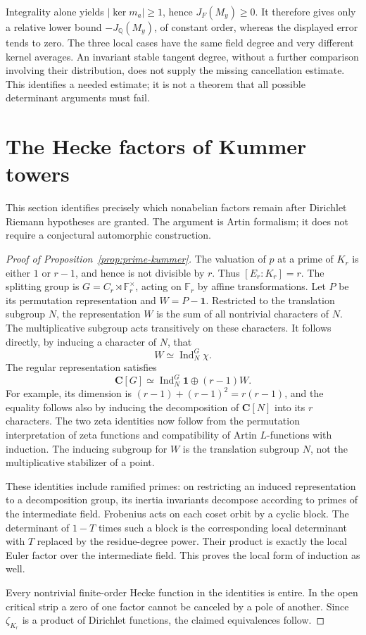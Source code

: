 \documentclass[11pt]{article}
\theoremstyle{remark}\newtheorem{remark}[theorem]{Remark}
\newcommand{\Q}{\mathbb Q}\newcommand{\Z}{\mathbb Z}\newcommand{\C}{\mathbb C}
\newcommand{\F}{\mathbb F}\newcommand{\Gal}{\operatorname{Gal}}
\begin{document}
Integrality alone yields $|\ker m_a|\ge1$, hence $J_F(M_y)\ge0$. It therefore gives only a relative lower bound $-J_\Q(M_y)$, of constant order, whereas the displayed error tends to zero. The three local cases have the same field degree and very different kernel averages. An invariant stable tangent degree, without a further comparison involving their distribution, does not supply the missing cancellation estimate. This identifies a needed estimate; it is not a theorem that all possible determinant arguments must fail.

\section{The Hecke factors of Kummer towers}
This section identifies precisely which nonabelian factors remain after Dirichlet Riemann hypotheses are granted. The argument is Artin formalism; it does not require a conjectural automorphic construction.

\begin{proof}[Proof of Proposition~\ref{prop:prime-kummer}]
The valuation of $p$ at a prime of $K_r$ is either $1$ or $r-1$, and hence is not divisible by $r$. Thus $[E_r:K_r]=r$. The splitting group is $G=C_r\rtimes\F_r^\times$, acting on $\F_r$ by affine transformations. Let $P$ be its permutation representation and $W=P-\mathbf1$. Restricted to the translation subgroup $N$, the representation $W$ is the sum of all nontrivial characters of $N$. The multiplicative subgroup acts transitively on these characters. It follows directly, by inducing a character of $N$, that
\[
 W\simeq\operatorname{Ind}_N^G\chi.
\]
The regular representation satisfies
\[
 \mathbf C[G]\simeq\operatorname{Ind}_N^G\mathbf1
       \oplus (r-1)W.
\]
For example, its dimension is $(r-1)+(r-1)^2=r(r-1)$, and the equality follows also by inducing the decomposition of $\mathbf C[N]$ into its $r$ characters. The two zeta identities now follow from the permutation interpretation of zeta functions and compatibility of Artin $L$-functions with induction. The inducing subgroup for $W$ is the translation subgroup $N$, not the multiplicative stabilizer of a point.

These identities include ramified primes: on restricting an induced representation to a decomposition group, its inertia invariants decompose according to primes of the intermediate field. Frobenius acts on each coset orbit by a cyclic block. The determinant of $1-T$ times such a block is the corresponding local determinant with $T$ replaced by the residue-degree power. Their product is exactly the local Euler factor over the intermediate field. This proves the local form of induction as well.

Every nontrivial finite-order Hecke function in the identities is entire. In the open critical strip a zero of one factor cannot be canceled by a pole of another. Since $\zeta_{K_r}$ is a product of Dirichlet functions, the claimed equivalences follow.
\end{proof}
\end{document}
